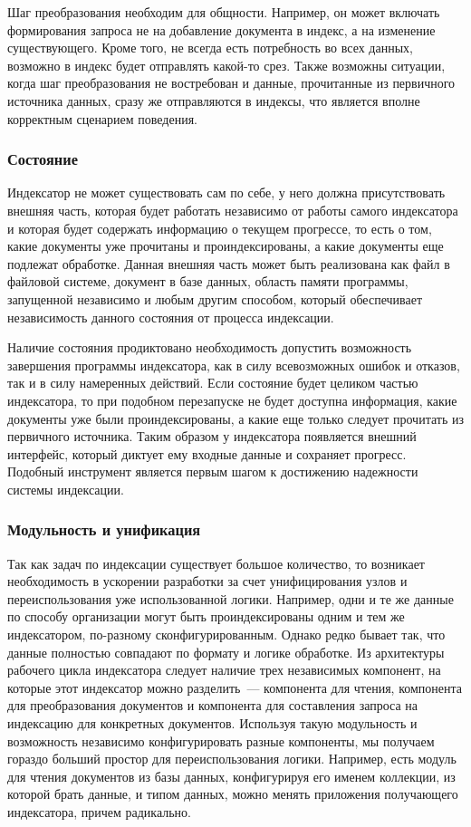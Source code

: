 Шаг преобразования необходим для общности. Например, он может включать формирования запроса не на добавление документа в индекс, а на изменение существующего. Кроме того, не всегда есть потребность во всех данных, возможно в индекс будет отправлять какой-то срез. Также возможны ситуации, когда шаг преобразования не востребован и данные, прочитанные из первичного источника данных, сразу же отправляются в индексы, что является вполне корректным сценарием поведения.

\subsubsection{Состояние}

Индексатор не может существовать сам по себе, у него должна присутствовать внешняя часть, которая будет работать независимо от работы самого индексатора и которая будет содержать информацию о текущем прогрессе, то есть о том, какие документы уже прочитаны и проиндексированы, а какие документы еще подлежат обработке. Данная внешняя часть может быть реализована как файл в файловой системе, документ в базе данных, область памяти программы, запущенной независимо и любым другим способом, который обеспечивает независимость данного состояния от процесса индексации.

Наличие состояния продиктовано необходимость допустить возможность завершения программы индексатора, как в силу всевозможных ошибок и отказов, так и в силу намеренных действий. Если состояние будет целиком частью индексатора, то при подобном перезапуске не будет доступна информация, какие документы уже были проиндексированы, а какие еще только следует прочитать из первичного источника. Таким образом у индексатора появляется внешний интерфейс, который диктует ему входные данные и сохраняет прогресс.  Подобный инструмент является первым шагом к достижению надежности системы индексации.

\subsubsection{Модульность и унификация}

Так как задач по индексации существует большое количество, то возникает необходимость в ускорении разработки за счет унифицирования узлов и переиспользования уже использованной логики. Например, одни и те же данные по способу организации могут быть проиндексированы одним и тем же индексатором, по-разному сконфигурированным. Однако редко бывает так, что данные полностью совпадают по формату и логике обработке. Из архитектуры рабочего цикла индексатора следует наличие трех независимых компонент, на которые этот индексатор можно разделить~--- компонента для чтения, компонента для преобразования документов и компонента для составления запроса на индексацию для конкретных документов. Используя такую модульность и возможность независимо конфигурировать разные компоненты, мы получаем гораздо больший простор для переиспользования логики. Например, есть модуль для чтения документов из базы данных, конфигурируя его именем коллекции, из которой брать данные, и типом данных, можно менять приложения получающего индексатора, причем радикально. 

